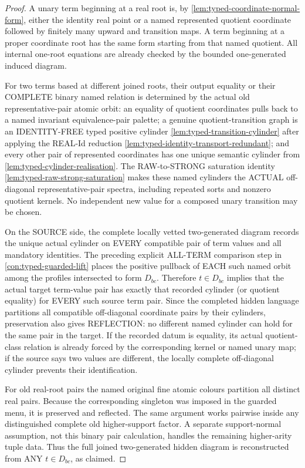 \begin{proof}
A unary term beginning at
a real root is, by
\cref{lem:typed-coordinate-normal-form},
either the identity real
point or a named represented
quotient coordinate followed
by finitely many upward and
transition maps. A term
beginning at a proper
coordinate root has the
same form starting from
that named quotient.
All internal one-root
equations are already checked
by the bounded one-generated
induced diagram.

For two terms based at
different joined roots,
their output equality or
their COMPLETE binary
named relation is determined
by the actual old
representative-pair atomic
orbit:
an equality of quotient
coordinates pulls back to
a named invariant
equivalence-pair palette;
a genuine quotient-transition
graph is an IDENTITY-FREE
typed positive cylinder
\cref{lem:typed-transition-cylinder}
after applying the REAL-Id
reduction
\cref{lem:typed-identity-transport-redundant};
and every other pair of
represented coordinates has
one unique semantic cylinder
from
\cref{lem:typed-cylinder-realisation}.
The RAW-to-STRONG saturation
identity
\cref{lem:typed-raw-strong-saturation}
makes these named cylinders
the ACTUAL off-diagonal
representative-pair spectra,
including repeated sorts
and nonzero quotient kernels.
No independent new value
for a composed unary
transition may be chosen.

On the SOURCE side, the
complete locally vetted
two-generated diagram records
the unique actual cylinder
on EVERY compatible pair
of term values and all
mandatory identities.
The preceding explicit
ALL-TERM comparison step in
\cref{con:typed-guarded-lift}
places the positive pullback
of EACH such named orbit
among the profiles
intersected to form
\(D_{bc}\). Therefore
\(t\in D_{bc}\) implies
that the actual target
term-value pair has exactly
that recorded cylinder
(or quotient equality)
for EVERY such source
term pair. Since the
completed hidden language
partitions all compatible
off-diagonal coordinate pairs
by their cylinders,
preservation also gives
REFLECTION: no different
named cylinder can hold
for the same pair in the
target. If the recorded
datum is equality, its
actual quotient-class
relation is already forced
by the corresponding
kernel or named unary map;
if the source says two
values are different,
the locally complete
off-diagonal cylinder
prevents their identification.

For old real-root pairs
the named original fine
atomic colours partition
all distinct real pairs.
Because the corresponding
singleton was imposed in
the guarded menu, it is
preserved and reflected.
The same argument works
pairwise inside any
distinguished complete
old higher-support factor.
A separate support-normal
assumption, not this binary
pair calculation, handles
the remaining higher-arity
tuple data. Thus the
full joined two-generated
hidden diagram is
reconstructed from ANY
\(t\in D_{bc}\), as claimed.
\end{proof}

